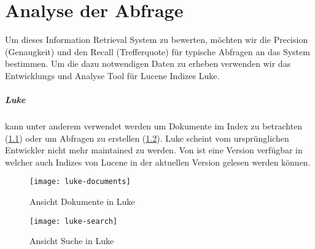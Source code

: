 \begin{comment}
Analysieren der Suchabfragen
\begin{itemize}
    \item Testdaten bestimmen.
    \item Qualität der Suche anhand von Precison und Recall mit den Testdaten bestimmen.
\end{itemize}


\paragraph{Result} \hfill \\
\begin{itemize}
    \item Definition von Beispiel-Anfragen und den dazu erwarteten Antworten.
    \item Analyse der Resultate.
\end{itemize}
\end{comment}


\chapter{Analyse der Abfrage}
\label{ch:analysis}

Um dieses Information Retrieval System zu bewerten,
möchten wir die Precision (Genaugkeit) und den Recall
(Trefferquote) für typische Abfragen an das System
bestimmen. Um die dazu notwendigen Daten zu erheben
verwenden wir das Entwicklungs und Analyse
Tool für Lucene Indizes Luke.

\paragraph{Luke} kann unter anderem verwendet werden um Dokumente
im Index zu betrachten (\cref{fig:luke-docs}) oder
um Abfragen zu erstellen (\cref{fig:luke-search}).
\cite{web:lukeintro}
Luke \cite{web:luke} scheint vom ursprünglichen
Entwickler \citeauthor{web:luke}
nicht mehr maintained zu werden. Von \citeauthor{web:lukegit}
ist eine Version verfügbar in welcher auch Indizes
von Lucene in der aktuellen Version gelesen werden
können. \cite{web:lukegit}

\begin{figure}[h]
    \centering
    \texttt{[image: luke-documents]}
    \caption{Ansicht Dokumente in Luke}
    \label{fig:luke-docs}
\end{figure}

\begin{figure}[h]
    \centering
    \texttt{[image: luke-search]}
    \caption{Ansicht Suche in Luke}
    \label{fig:luke-search}
\end{figure}

